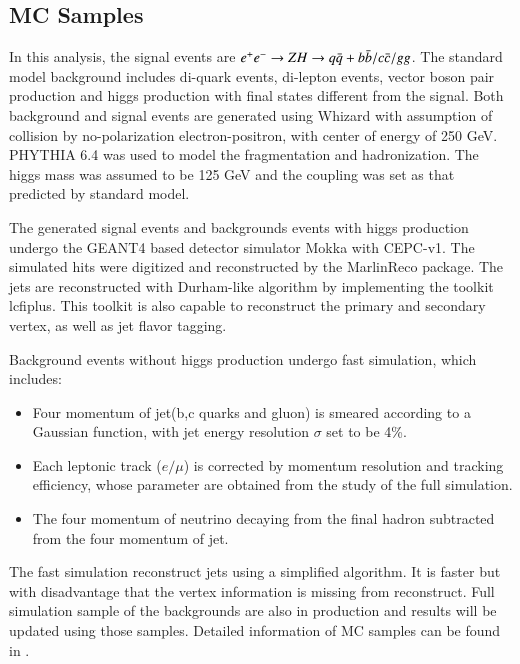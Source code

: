 \subsection{MC Samples}
In this analysis, the signal events are $e^+e^-\rightarrow Z H\rightarrow q\bar{q} + b\bar{b}/c\bar{c}/gg$. The standard model background includes di-quark events, di-lepton events, vector boson pair production and higgs production with final states different from the signal. Both background and signal events are generated using Whizard\cite{Wizard_1} with assumption of collision by no-polarization electron-positron, with center of energy of 250 GeV. PHYTHIA 6.4 \cite{PYTHIA64} was used to model the fragmentation and hadronization. The higgs mass was assumed to be 125 GeV and the coupling was set as that predicted by standard model.\par
The generated signal events and backgrounds events with higgs production undergo the GEANT4\cite{Geant4} based detector simulator Mokka\cite{mokka} with CEPC-v1. The simulated hits were digitized and reconstructed by the MarlinReco package. 
The jets are reconstructed with Durham-like algorithm\cite{Durham} by implementing the toolkit lcfiplus\cite{LCFIPlus}. This toolkit is also capable to reconstruct the primary and secondary vertex, as well as jet flavor tagging.\par
Background events without higgs production undergo fast simulation, which includes:
\begin{itemize}
\item Four momentum of jet(b,c quarks and gluon) is smeared according to a Gaussian function, with jet energy  
resolution $\sigma$ set to be 4\%.
\item Each leptonic track ($e/\mu$) is corrected by momentum resolution and tracking efficiency, whose parameter are obtained from the study of the full simulation.
\item The four momentum of neutrino decaying from the final hadron subtracted from the four momentum of jet.
\end{itemize} 
The fast simulation reconstruct jets using a simplified algorithm. It is faster but with disadvantage that the vertex information is missing from reconstruct. Full simulation sample of the backgrounds are also in production and results will be updated using those samples. Detailed information of MC samples can be found in \cite{Samples}.
\clearpage
